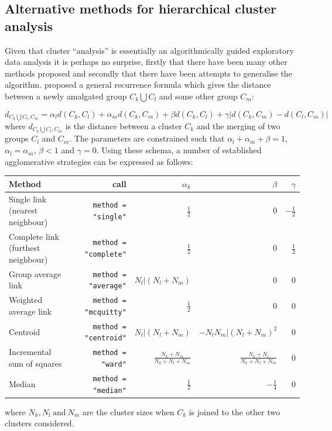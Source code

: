 \subsection{Alternative methods for hierarchical cluster analysis}
\label{othermethods}

Given that cluster ``analysis'' is essentially an algorithmically guided exploratory data analysis it is perhaps no surprise, firstly that there have been many other methods proposed and secondly that there have been attempts to generalise the algorithm.   \cite{Lance+Williams:1966,Lance+Williams:1967} proposed a general recurrence formula which gives the distance between a newly amalgated group $C_{k} \bigcup C_{l}$ and some other group $C_{m}$:

\begin{equation}
d_{C_{k} \bigcup C_{l}, C_{m}} = \alpha_{l} d(C_{k}, C_{l}) + \alpha_{m} d(C_{k}, C_{m}) + \beta d(C_{k}, C_{l}) + \gamma \lvert d(C_{k}, C_{m}) -  d(C_{l}, C_{m})\rvert 
\end{equation}
where $d_{C_{k} \bigcup C_{l}, C_{m}}$ is the distance between a cluster $C_{k}$ and the merging of two groups  $C_{l}$ and $C_{m}$.   The parameters are constrained such that $\alpha_{l} + \alpha_{m} + \beta = 1$, $\alpha_{l} = \alpha_{m}$, $\beta < 1$ and $\gamma = 0$.   Using these schema, a number of established agglomerative strategies can be expressed as follows:
\begin{tabular}{lrrrr}
Method & \R call &  $\alpha_{k}$ & $\beta$ & $\gamma$ \\
\hline
Single link (nearest neighbour) & \verb+method = "single"+ & $\frac{1}{2}$ & 0 & $-\frac{1}{2}$ \\
Complete link (furthest neighbour) &  \verb+method = "complete"+ & $\frac{1}{2}$ & 0 & $\frac{1}{2}$ \\
Group average link &  \verb+method = "average"+ & $N_{l}|(N_{l} + N_{m})$ & 0 & 0\\
Weighted average link &  \verb+method = "mcquitty"+ & $\frac{1}{2}$ & 0 & 0 \\
Centroid &   \verb+method = "centroid"+ & $N_{l}|(N_{l} + N_{m})$ &  $- N_{l} N_{m}|(N_{l} + N_{m})^2$ & 0\\
Incremental sum of squares &  \verb+method = "ward"+ & $\frac{N_{k} + N_{m}}{N_{k} + N_{l} + N_{m}}$ &  
$\frac{N_{k} + N_{l}}{N_{k} + N_{l} + N_{m}}$ & 0 \\
Median &  \verb+method = "median"+ & $\frac{1}{2}$ & $-\frac{1}{4}$ & 0\\
\end{tabular}
where $N_{k}, N_{l}\ \mbox{and}\ N_{m}$ are the cluster sizes when $C_{k}$ is joined to the other two clusters considered.


